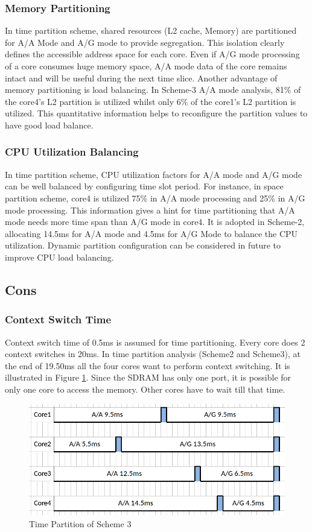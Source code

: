 \subsubsection{Memory Partitioning}
In time partition scheme, shared resources (L2 cache, Memory) are partitioned for A/A Mode and A/G mode to provide segregation. This isolation clearly defines the accessible address space for each core. Even if A/G mode processing of a core consumes huge memory space, A/A mode data of the core remains intact and will be useful during the next time slice. Another advantage of memory partitioning is load balancing. In Scheme-3 A/A mode analysis, 81\% of the core4's L2 partition is utilized whilst only 6\% of the core1's L2 partition is utilized. This quantitative information helps to reconfigure the partition values to have good load balance.

\subsubsection{CPU Utilization Balancing}
In time partition scheme, CPU utilization factors for A/A mode and A/G mode can be well balanced by configuring time slot period. For instance, in space partition scheme, core4 is utilized 75\% in A/A mode processing and 25\% in A/G mode processing. This information gives a hint for time partitioning that A/A mode needs more time span than A/G mode in core4. It is adopted in Scheme-2, allocating 14.5ms for A/A mode and 4.5ms for A/G Mode to balance the CPU utilization. Dynamic partition configuration can be considered in future to improve CPU load balancing.

\subsection{Cons}
\label{mm:cons}

\subsubsection{Context Switch Time}
Context switch time of 0.5ms is assumed for time partitioning. Every core does 2 context switches in 20ms. In time partition analysis (Scheme2 and Scheme3), at the end of 19.50ms all the four cores want to perform context switching. It is illustrated in Figure \ref{fig:mm:mm_cons1}. Since the SDRAM has only one port, it is possible for only one core to access the memory. Other cores have to wait till that time. 

\begin{figure}[h!]
	\centering
	\includegraphics[width=120mm]{figures/mm_cons1}
	\caption{Time Partition of Scheme 3}
	\label{fig:mm:mm_cons1}
\end{figure}

